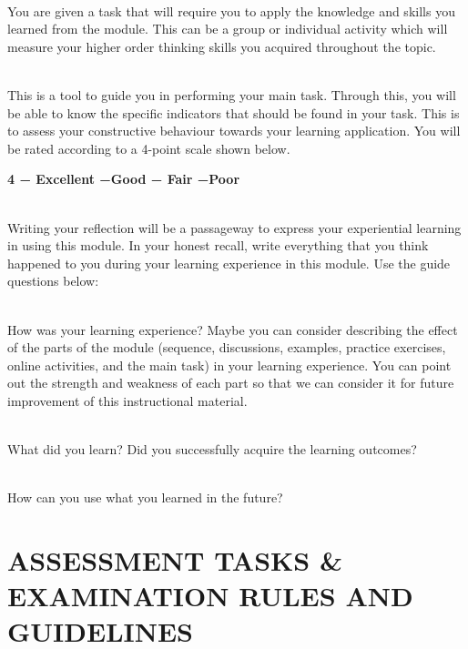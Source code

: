\begin{description}[{format=\textcolor{ulabblue}}]
\item[MAIN TASK.]\leavevmode\\
You are given a task that will require you to apply the knowledge and skills you learned from the module. This can be a group or individual activity which will measure your higher order thinking skills you acquired throughout the topic.

\item[RUBRICS. ]\leavevmode\\
This is a tool to guide you in performing your main task. Through this, you will be able to know the specific indicators that should be found in your task. This is to assess your constructive behaviour towards your learning application. You will be rated according to a 4-point scale shown below.
\begin{center}
{\color{ulabgold} \bf 4 − Excellent\quad{} −Good\quad{} − Fair \quad{} −Poor}
\end{center}
\item[REFLECTIONS.]\leavevmode\\
Writing your reflection will be a passageway to express your experiential learning in using this module. In your honest recall, write everything that you think happened to you during your learning experience in this module. Use the guide questions below:
\begin{description}[{format=\textcolor{ulabblue}}]
\item[First paragraph. ]\leavevmode\\
How was your learning experience? Maybe you can consider describing the effect of the parts of the module (sequence, discussions, examples, practice exercises, online activities, and the main task) in your learning experience. You can point out the strength and weakness of each part so that we can consider it for future improvement of this instructional material.
\item[Second paragraph.  ]\leavevmode\\
What did you learn? Did you successfully acquire the learning outcomes?

\item[Third paragraph.]\leavevmode\\
How can you use what you learned in the future?
\end{description}
\end{description}

\section{ASSESSMENT  TASKS \& EXAMINATION   RULES AND GUIDELINES}

